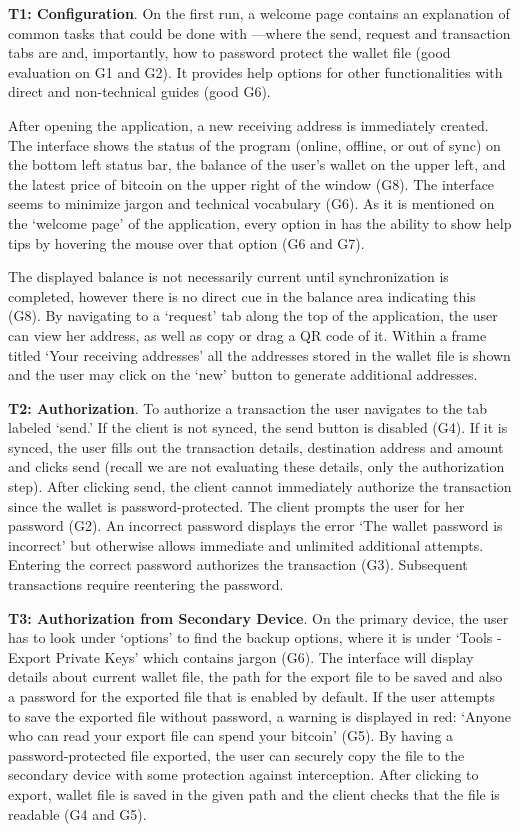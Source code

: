 \textbf{T1: Configuration}.
On the first run, a welcome page contains an explanation of common tasks that could be done with \multibit---where the send, request and transaction tabs are and, importantly, how to password protect the wallet file (good evaluation on G1 and G2). It provides help options for other functionalities with direct and non-technical guides (good G6). 

After opening the application, a new receiving address is immediately created. The interface shows the status of the program (online, offline, or out of sync) on the bottom left status bar, the balance of the user's wallet on the upper left, and the latest price of bitcoin on the upper right of the window (G8). The interface seems to minimize jargon and technical vocabulary (G6). As it is mentioned on the `welcome page' of the application, every option in \multibit has the ability to show help tips by hovering the mouse over that option (G6 and G7).

The displayed balance is not necessarily current until synchronization is completed, however there is no direct cue in the balance area indicating this (G8). By navigating to a `request' tab along the top of the application, the user can view her address, as well as copy or drag a QR code of it. Within a frame titled `Your receiving addresses' all the addresses stored in the wallet file is shown and the user may click on the `new' button to generate additional addresses. 

\textbf{T2: Authorization}.
To authorize a transaction the user navigates to the tab labeled `send.' If the client is not synced, the send button is disabled (G4). If it is synced, the user fills out the transaction details, destination address and amount and clicks send (recall we are not evaluating these details, only the authorization step). After clicking send, the client cannot immediately authorize the transaction since the wallet is password-protected. The client prompts the user for her password (G2). An incorrect password displays the error `The wallet password is incorrect' but otherwise allows immediate and unlimited additional attempts. Entering the correct password authorizes the transaction (G3). Subsequent transactions require reentering the password.


\textbf{T3: Authorization from Secondary Device}.
On the primary device, the user has to look under `options' to find the backup options, where it is under `Tools - Export Private Keys' which contains jargon (G6). The interface will display details about current wallet file, the path for the export file to be saved and also a password for the exported file that is enabled by default. If the user attempts to save the exported file without password, a warning is displayed in red: `Anyone who can read your export file can spend your bitcoin' (G5). By having a password-protected file exported, the user can securely copy the file to the secondary device with some protection against interception. After clicking to export, wallet file is saved in the given path and the client checks that the file is readable (G4 and G5). 


